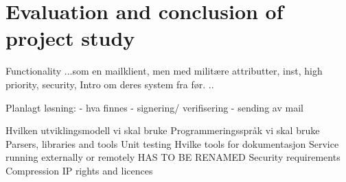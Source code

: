 \pagebreak
\section{Evaluation and conclusion of project study}

Functionality ...som en mailklient, men med militære attributter, inst, high priority, security, Intro om deres system fra før. ..

Planlagt løsning:
	- hva finnes
		- signering/ verifisering
		- sending av mail

Hvilken utviklingsmodell vi skal bruke
Programmeringsspråk vi skal bruke
Parsers, libraries and tools
Unit testing
Hvilke tools for dokumentasjon
Service running externally or remotely HAS TO BE RENAMED
Security requirements
Compression
IP rights and licences
